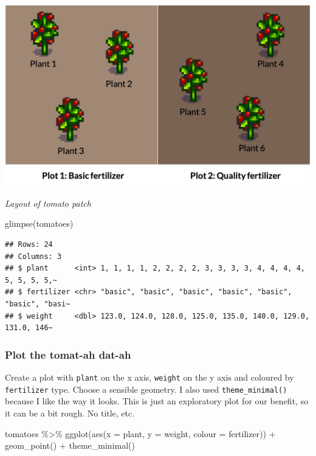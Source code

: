 \documentclass[
  openany]{book}
\newenvironment{Shaded}{\begin{snugshade}}{\end{snugshade}}
\newcommand{\AttributeTok}[1]{\textcolor[rgb]{0.77,0.63,0.00}{#1}}
\newcommand{\FunctionTok}[1]{\textcolor[rgb]{0.00,0.00,0.00}{#1}}
\newcommand{\NormalTok}[1]{#1}
\newcommand{\SpecialCharTok}[1]{\textcolor[rgb]{0.00,0.00,0.00}{#1}}
\begin{document}
\begin{center}\includegraphics[width=1\linewidth]{images/m3/tomatoplot} \end{center}

\emph{Layout of tomato patch}

\begin{Shaded}
\begin{Highlighting}[]
\FunctionTok{glimpse}\NormalTok{(tomatoes)}
\end{Highlighting}
\end{Shaded}

\begin{verbatim}
## Rows: 24
## Columns: 3
## $ plant      <int> 1, 1, 1, 1, 2, 2, 2, 2, 3, 3, 3, 3, 4, 4, 4, 4, 5, 5, 5, 5,~
## $ fertilizer <chr> "basic", "basic", "basic", "basic", "basic", "basic", "basi~
## $ weight     <dbl> 123.0, 124.0, 128.0, 125.0, 135.0, 140.0, 129.0, 131.0, 146~
\end{verbatim}

\hypertarget{plot-the-tomat-ah-dat-ah}{%
\subsubsection{Plot the tomat-ah dat-ah}\label{plot-the-tomat-ah-dat-ah}}

Create a plot with \texttt{plant} on the x axis, \texttt{weight} on the y axis and coloured by \texttt{fertilizer} type. Choose a sensible geometry. I also used \texttt{theme\_minimal()} because I like the way it looks. This is just an exploratory plot for our benefit, so it can be a bit rough. No title, etc.

\begin{Shaded}
\begin{Highlighting}[]
\NormalTok{tomatoes }\SpecialCharTok{\%\textgreater{}\%} 
  \FunctionTok{ggplot}\NormalTok{(}\FunctionTok{aes}\NormalTok{(}\AttributeTok{x =}\NormalTok{ plant, }\AttributeTok{y =}\NormalTok{ weight, }\AttributeTok{colour =}\NormalTok{ fertilizer)) }\SpecialCharTok{+}
  \FunctionTok{geom\_point}\NormalTok{() }\SpecialCharTok{+}
  \FunctionTok{theme\_minimal}\NormalTok{()}
\end{Highlighting}
\end{Shaded}
\end{document}
